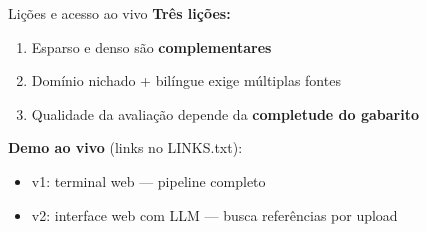 \documentclass{beamer}
\begin{document}

\begin{frame}{Lições e acesso ao vivo}
  \textbf{Três lições:}
  \begin{enumerate}
    \item Esparso e denso são \textbf{complementares}
    \item Domínio nichado + bilíngue exige múltiplas fontes
    \item Qualidade da avaliação depende da \textbf{completude do gabarito}
  \end{enumerate}

  \vspace{1em}
  \textbf{Demo ao vivo} (links no LINKS.txt):
  \begin{itemize}
    \item v1: terminal web — pipeline completo
    \item v2: interface web com LLM — busca referências por upload
  \end{itemize}
\end{frame}


\appendix
\backmatter
\end{document}
